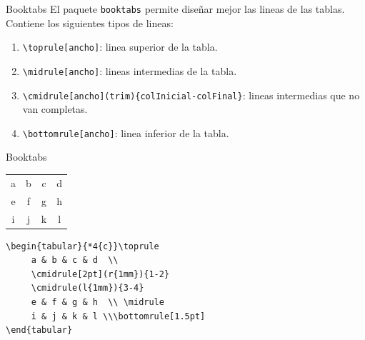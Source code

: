 \documentclass[dvipsnames,xcolor, handout]{beamer}
\theoremstyle{plain}
\theoremstyle{definition}
\begin{document}
\begin{frame}[fragile]{Booktabs}
    El paquete \verb!booktabs! permite diseñar mejor las lineas de las tablas. Contiene los siguientes tipos de lineas:
    \begin{enumerate}
        \item \verb!\toprule[ancho]!: linea superior de la tabla.
        \item \verb!\midrule[ancho]!: lineas intermedias de la tabla.
        \item \verb!\cmidrule[ancho](trim){colInicial-colFinal}!: lineas intermedias que no van completas.
        \item \verb!\bottomrule[ancho]!: linea inferior de la tabla.
    \end{enumerate}
\end{frame}

\begin{frame}[fragile]{Booktabs}
\begin{center}
    \begin{tabular}{*4{c}}\toprule
     a & b & c & d  \\
     \cmidrule[2pt](r{1mm}){1-2}
     \cmidrule(l{1mm}){3-4}
     e & f & g & h  \\ \midrule
     i & j & k & l \\\bottomrule[1.5pt]
\end{tabular}
\end{center}

\begin{verbatim}
\begin{tabular}{*4{c}}\toprule
     a & b & c & d  \\
     \cmidrule[2pt](r{1mm}){1-2}
     \cmidrule(l{1mm}){3-4}
     e & f & g & h  \\ \midrule
     i & j & k & l \\\bottomrule[1.5pt]
\end{tabular}
\end{verbatim}

\end{frame}
\end{document}
